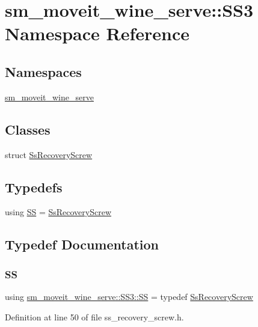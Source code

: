 \hypertarget{namespacesm__moveit__wine__serve_1_1SS3}{}\section{sm\+\_\+moveit\+\_\+wine\+\_\+serve\+:\+:S\+S3 Namespace Reference}
\label{namespacesm__moveit__wine__serve_1_1SS3}
\subsection*{Namespaces}
\begin{DoxyCompactItemize}
\item 
 \hyperlink{namespacesm__moveit__wine__serve_1_1SS3_1_1sm__moveit__wine__serve}{sm\+\_\+moveit\+\_\+wine\+\_\+serve}
\end{DoxyCompactItemize}
\subsection*{Classes}
\begin{DoxyCompactItemize}
\item 
struct \hyperlink{structsm__moveit__wine__serve_1_1SS3_1_1SsRecoveryScrew}{Ss\+Recovery\+Screw}
\end{DoxyCompactItemize}
\subsection*{Typedefs}
\begin{DoxyCompactItemize}
\item 
using \hyperlink{namespacesm__moveit__wine__serve_1_1SS3_a3d28a0841b844d7cab4048e1bbbb0d9c}{SS} = \hyperlink{structsm__moveit__wine__serve_1_1SS3_1_1SsRecoveryScrew}{Ss\+Recovery\+Screw}
\end{DoxyCompactItemize}


\subsection{Typedef Documentation}
\mbox{\label{namespacesm__moveit__wine__serve_1_1SS3_a3d28a0841b844d7cab4048e1bbbb0d9c}} 
\subsubsection{\texorpdfstring{SS}{SS}}
{\footnotesize\ttfamily using \hyperlink{namespacesm__moveit__wine__serve_1_1SS3_a3d28a0841b844d7cab4048e1bbbb0d9c}{sm\+\_\+moveit\+\_\+wine\+\_\+serve\+::\+S\+S3\+::\+SS} = typedef \hyperlink{structsm__moveit__wine__serve_1_1SS3_1_1SsRecoveryScrew}{Ss\+Recovery\+Screw}}



Definition at line 50 of file ss\+\_\+recovery\+\_\+screw.\+h.

